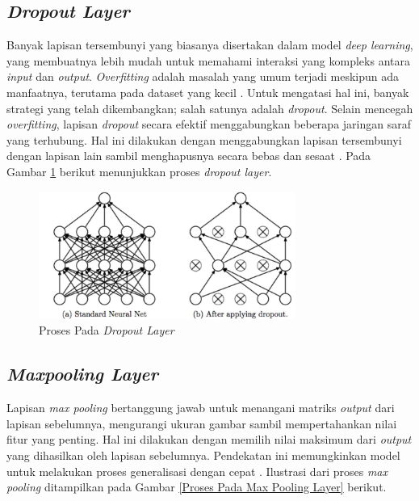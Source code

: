 \subsection{\textit{Dropout Layer}}

    Banyak lapisan tersembunyi yang biasanya disertakan dalam model \textit{deep learning}, yang membuatnya lebih mudah untuk memahami interaksi yang kompleks antara \textit{input} dan \textit{output}. \textit{Overfitting} adalah masalah yang umum terjadi meskipun ada manfaatnya, terutama pada dataset yang kecil \cite{Srivastava2014}. Untuk mengatasi hal ini, banyak strategi yang telah dikembangkan; salah satunya adalah \textit{dropout}. Selain mencegah \textit{overfitting}, lapisan \textit{dropout} secara efektif menggabungkan beberapa jaringan saraf yang terhubung. Hal ini dilakukan dengan menggabungkan lapisan tersembunyi dengan lapisan lain sambil menghapusnya secara bebas dan sesaat \cite{Srivastava2014}. Pada Gambar \ref{Proses Pada Dropout Layer} berikut menunjukkan proses \textit{dropout layer}.

    \begin{figure}[H]
      \centering
      \includegraphics[width=0.75\textwidth]{figures/bab2/drop out.jpg}
      \caption{Proses Pada \textit{Dropout Layer} \cite{ida}}
      \label{Proses Pada Dropout Layer}
    
    \end{figure} 
    

\subsection{\textit{Maxpooling Layer}}

    Lapisan \textit{max pooling} bertanggung jawab untuk menangani matriks \textit{output} dari lapisan sebelumnya, mengurangi ukuran gambar sambil mempertahankan nilai fitur yang penting. Hal ini dilakukan dengan memilih nilai maksimum dari \textit{output} yang dihasilkan oleh lapisan sebelumnya. Pendekatan ini memungkinkan model untuk melakukan proses generalisasi dengan cepat \cite{Gholamalinezhad2020, Nagi2011MaxpoolingCN}. Ilustrasi dari proses \textit{max pooling} ditampilkan pada Gambar \ref{Proses Pada Max Pooling Layer} berikut.


